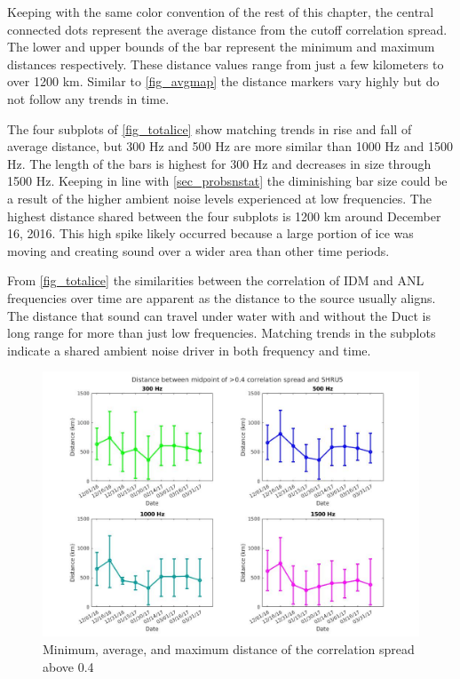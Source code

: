 Keeping with the same color convention of the rest of this chapter, the central connected dots represent the average distance from the cutoff correlation spread. The lower and upper bounds of the bar represent the minimum and maximum distances respectively. These distance values range from just a few kilometers to over 1200 km. Similar to \autoref{fig_avgmap} the distance markers vary highly but do not follow any trends in time. 

The four subplots of \autoref{fig_totalice} show matching trends in rise and fall of average distance, but 300 Hz and 500 Hz are more similar than 1000 Hz and 1500 Hz. The length of the bars is highest for 300 Hz and decreases in size through 1500 Hz. Keeping in line with \autoref{sec_probsnstat} the diminishing bar size could be a result of the higher ambient noise levels experienced at low frequencies. The highest distance shared between the four subplots is 1200 km around December 16, 2016. This high spike likely occurred because a large portion of ice was moving and creating sound over a wider area than other time periods.

From \autoref{fig_totalice} the similarities between the correlation of IDM and ANL frequencies over time are apparent as the distance to the source usually aligns. The distance that sound can travel under water with and without the Duct is long range for more than just low frequencies. Matching trends in the subplots indicate a shared ambient noise driver in both frequency and time. 

\begin{figure}[p]
\centering
\includegraphics[scale=0.38]{Figures/errorbars_tiled_noisland.jpg}
\caption{Minimum, average, and maximum distance of the correlation spread above 0.4}
\label{fig_totalice}
\end{figure}

